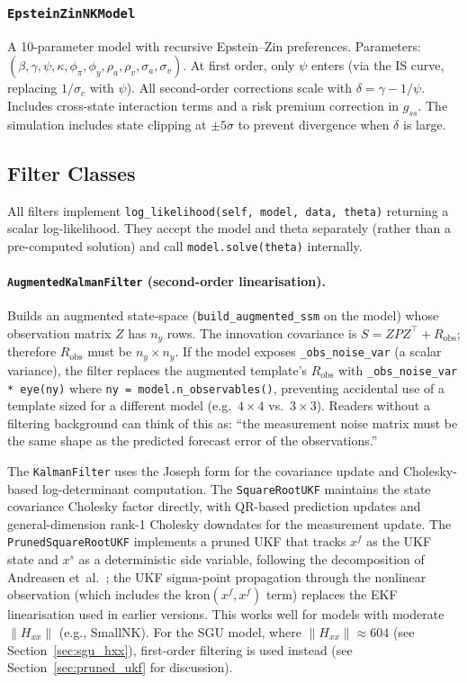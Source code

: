 \documentclass[11pt,a4paper]{article}
\theoremstyle{definition}
\newcommand{\code}[1]{\texttt{\color{codecolor}#1}}
\begin{document}
	\subsubsection{\code{EpsteinZinNKModel}}
	
	A 10-parameter model with recursive Epstein--Zin preferences.
	Parameters: $(\beta, \gamma, \psi, \kappa, \phi_\pi, \phi_y, \rho_a, \rho_v, \sigma_a, \sigma_v)$.
	At first order, only $\psi$ enters (via the IS curve, replacing $1/\sigma_c$ with $\psi$).
	All second-order corrections scale with $\delta = \gamma - 1/\psi$.
	Includes cross-state interaction terms and a risk premium correction in $g_{ss}$.
	The simulation includes state clipping at $\pm 5\sigma$ to prevent divergence when $\delta$ is large.
	
	\subsection{Filter Classes}
	\label{app:dsgeEZ_filters}
	
	All filters implement \code{log\_likelihood(self, model, data, theta)} returning a scalar log-likelihood.
	They accept the model and theta separately (rather than a pre-computed solution) and call \code{model.solve(theta)} internally.
	
	\paragraph{\code{AugmentedKalmanFilter} (second-order linearisation).}
	Builds an augmented state-space (\code{build\_augmented\_ssm} on the model) whose observation matrix $Z$ has $n_y$ rows.
	The innovation covariance is $S = Z P Z^\top + R_{\mathrm{obs}}$; therefore $R_{\mathrm{obs}}$ must be $n_y \times n_y$.
	If the model exposes \code{\_obs\_noise\_var} (a scalar variance), the filter replaces the augmented template's $R_{\mathrm{obs}}$ with \code{\_obs\_noise\_var * eye(ny)} where \code{ny = model.n\_observables()}, preventing accidental use of a template sized for a different model (e.g.\ $4 \times 4$ vs.\ $3 \times 3$).
	Readers without a filtering background can think of this as: ``the measurement noise matrix must be the same shape as the predicted forecast error of the observations.''
	
	The \code{KalmanFilter} uses the Joseph form for the covariance update and Cholesky-based log-determinant computation.
	The \code{SquareRootUKF} maintains the state covariance Cholesky factor directly, with QR-based prediction updates and general-dimension rank-1 Cholesky downdates for the measurement update.
	The \code{PrunedSquareRootUKF} implements a pruned UKF that tracks $x^f$ as the UKF state and $x^s$ as a deterministic side variable, following the decomposition of Andreasen et~al.~\cite{andreasen2018pruning}; the UKF sigma-point propagation through the nonlinear observation (which includes the $\text{kron}(x^f, x^f)$ term) replaces the EKF linearisation used in earlier versions.
	This works well for models with moderate $\|H_{xx}\|$ (e.g., SmallNK).
	For the SGU model, where $\|H_{xx}\| \approx 604$ (see Section~\ref{sec:sgu_hxx}), first-order filtering is used instead (see Section~\ref{sec:pruned_ukf} for discussion).
	
\end{document}
